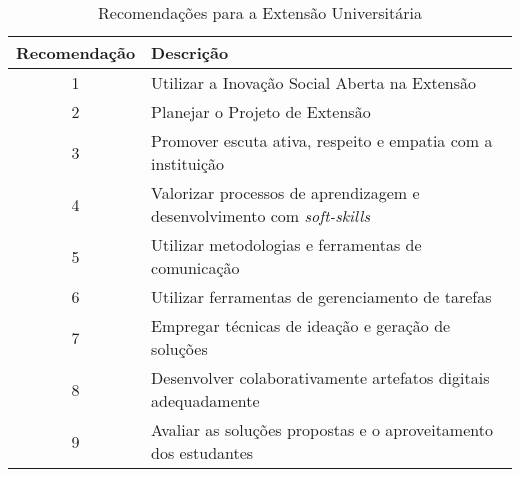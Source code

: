 \begin{table}[H]
\centering
\caption{Recomendações para a Extensão Universitária}
\begin{tabular}{|c|p{11cm}|}
\hline
\textbf{Recomendação} & \textbf{Descrição} \\ \hline
1 & Utilizar a Inovação Social Aberta na Extensão \\ \hline
2 & Planejar o Projeto de Extensão  \\ \hline
3 & Promover escuta ativa, respeito e empatia com a instituição \\ \hline
4 & Valorizar processos de aprendizagem e desenvolvimento com \textit{soft-skills} \\ \hline
5 & Utilizar metodologias e ferramentas de comunicação \\ \hline
6 & Utilizar ferramentas de gerenciamento de tarefas \\ \hline
7 & Empregar técnicas de ideação e geração de soluções \\ \hline
8 & Desenvolver colaborativamente artefatos digitais adequadamente \\ \hline
9 & Avaliar as soluções propostas e o aproveitamento dos estudantes \\ \hline
\end{tabular}
\end{table}
